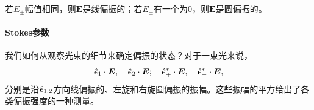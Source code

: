 若$E_\pm$幅值相同，则$\bm E$是线偏振的；若$E_\pm$有一个为0，则$\bm E$是圆偏振的。
\paragraph{Stokes参数}
我们如何从观察光束的细节来确定偏振的状态？对于一束光来说，
\begin{equation}
    \mathop{}\!\hat{\bm \epsilon}_1\cdot\bm E,\quad\mathop{}\!\hat{\bm \epsilon}_2\cdot\bm E;\quad\mathop{}\!\hat{\bm \epsilon}_+^\ast\cdot\bm E,\quad\mathop{}\!\hat{\bm \epsilon}_-^\ast\cdot\bm E,
\end{equation}
分别是沿$\mathop{}\!\hat{\bm \epsilon}_{1,2}$方向线偏振的、左旋和右旋圆偏振的振幅。这些振幅的平方给出了各类偏振强度的一种测量。%

